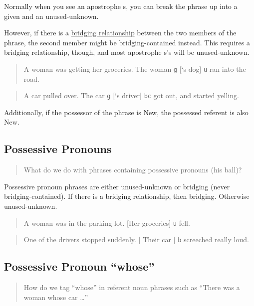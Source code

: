 \documentclass[
]{book}
\begin{document}
Normally when you see an apostrophe s, you can break the phrase up into a given and an unused-unknown.

However, if there is a \protect\hyperlink{bridging-relationships}{bridging relationship} between the two members of the phrase, the second member might be bridging-contained instead.
This requires a bridging relationship, though, and most apostrophe s's will be unused-unknown.

\begin{quote}
A woman was getting her groceries.
The woman \texttt{g} {[}`s dog{]} \texttt{u} ran into the road.
\end{quote}

\begin{quote}
A car pulled over.
The car \texttt{g} {[}`s driver{]} \texttt{bc} got out, and started yelling.
\end{quote}

Additionally, if the possessor of the phrase is New,
the possessed referent is also New.

\hypertarget{possessive-pronouns}{%
\subsection{Possessive Pronouns}\label{possessive-pronouns}}

\begin{quote}
What do we do with phrases containing possessive pronouns (his ball)?
\end{quote}

Possessive pronoun phrases are either unused-unknown or bridging (never bridging-contained).
If there is a bridging relationship, then bridging. Otherwise unused-unknown.

\begin{quote}
A woman was in the parking lot.
{[}Her groceries{]} \texttt{u} fell.
\end{quote}

\begin{quote}
One of the drivers stopped suddenly.
{[} Their car {]} \texttt{b} screeched really loud.
\end{quote}

\hypertarget{possessive-pronoun-whose}{%
\subsection{Possessive Pronoun ``whose''}\label{possessive-pronoun-whose}}

\begin{quote}
How do we tag ``whose'' in referent noun phrases such as ``There was a woman whose car \ldots{}''
\end{quote}
\end{document}
